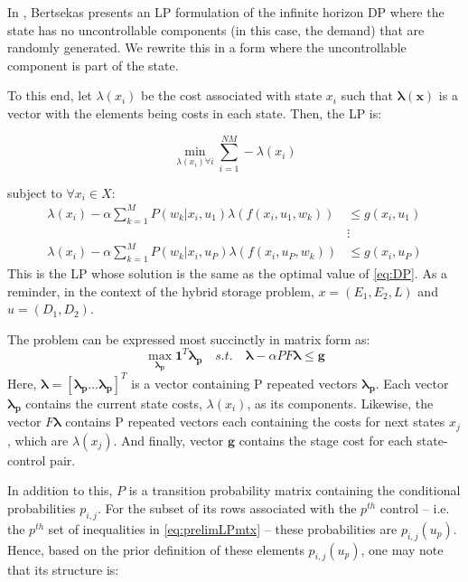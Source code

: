 \documentclass[conference]{IEEEtran}
\begin{document}
In \cite{Bertsekas:2007:DPO:1396348}, Bertsekas presents an LP formulation of the infinite horizon DP where the state has no uncontrollable components (in this case, the demand) that are randomly generated. We rewrite this in a form where the uncontrollable component is part of the state.

To this end, let $\lambda(x_{i})$ be the cost associated with state $x_{i}$ such that $\boldsymbol{\lambda(x)}$ is a vector with the elements being costs in each state. Then, the LP is:

\begin{equation} \label{eq:prelimLP}
\min_{\lambda(x_{i}) \forall i} \sum_{i=1}^{NM} -\lambda(x_{i})
\end{equation}

subject to $\forall x_{i} \in X$: \begin{align*}
\lambda(x_{i})-\alpha\sum_{k=1}^{M}P(w_{k} | x_{i},u_{1})\lambda(f(x_{i},u_{1},w_{k})) &\leq g(x_{i},u_{1}) \\
&\vdots\\
\lambda(x_{i})-\alpha\sum_{k=1}^{M}P(w_{k} | x_{i},u_{P})\lambda(f(x_{i},u_{P},w_{k})) &\leq g(x_{i},u_{P})
\end{align*} This is the LP whose solution is the same as the optimal value of \eqref{eq:DP}. As a reminder, in the context of the hybrid storage problem, $x=(E_{1},E_{2},L)$ and $u=(D_{1},D_{2})$.

The problem can be expressed most succinctly in matrix form as:
\begin{equation} \label{eq:prelimLPmtx}
    \max_{\boldsymbol{\lambda_{p}}} \boldsymbol{1}^{T} \boldsymbol{\lambda_{p}}
    \hspace{1em}s.t.\hspace{1em}
    \boldsymbol{\lambda}-\alpha PF\boldsymbol{\lambda} \leq \boldsymbol{g}
\end{equation} Here, $\boldsymbol{\lambda} = [\boldsymbol{\lambda_{p}}\hdots \boldsymbol{\lambda_{p}}]^{T}$ is a vector containing P repeated vectors $\boldsymbol{\lambda_{p}}$. Each vector $\boldsymbol{\lambda_{p}}$ contains the current state costs, $\lambda(x_{i})$, as its components. Likewise, the vector $F\boldsymbol{\lambda}$ contains P repeated vectors each containing the costs for next states $x_{j}$, which are $\lambda(x_{j})$. And finally, vector $\boldsymbol{g}$ contains the stage cost for each state-control pair. 

In addition to this, $P$ is a transition probability matrix containing the conditional probabilities $p_{i,j}$. For the subset of its rows associated with the $p^{th}$ control -- i.e. the $p^{th}$ set of inequalities in \eqref{eq:prelimLPmtx} -- these probabilities are $p_{i,j}(u_{p})$. Hence, based on the prior definition of these elements $p_{i,j}(u_{p})$, one may note that its structure is:
\end{document}
